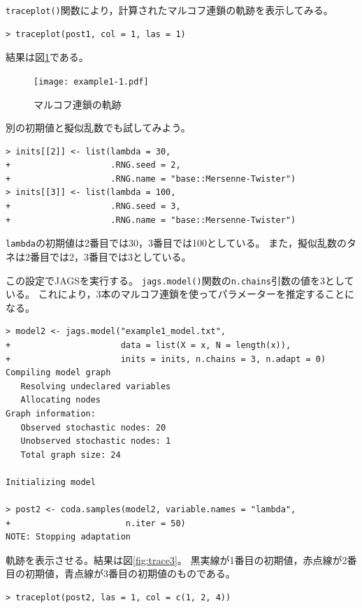 \documentclass[11pt,uplatex]{jsarticle}
\begin{document}
\texttt{traceplot()}関数により，計算されたマルコフ連鎖の軌跡を表示してみる。
\begin{lstlisting}
> traceplot(post1, col = 1, las = 1)
\end{lstlisting}
%
結果は図\ref{fig:trace1}である。

\begin{figure}[hbtp]
  \begin{center}
    \texttt{[image: example1-1.pdf]}
  \end{center}
  \caption{マルコフ連鎖の軌跡}
  \label{fig:trace1}
\end{figure}

別の初期値と擬似乱数でも試してみよう。
\begin{lstlisting}
> inits[[2]] <- list(lambda = 30,
+                    .RNG.seed = 2,
+                    .RNG.name = "base::Mersenne-Twister")
> inits[[3]] <- list(lambda = 100,
+                    .RNG.seed = 3,
+                    .RNG.name = "base::Mersenne-Twister")
\end{lstlisting}
\texttt{lambda}の初期値は2番目では30，3番目では100としている。
また，擬似乱数のタネは2番目では2，3番目では3としている。

この設定で\textsf{JAGS}を実行する。
\texttt{jags.model()}関数の\texttt{n.chains}引数の値を3としている。
これにより，3本のマルコフ連鎖を使ってパラメーターを推定することになる。
\begin{lstlisting}
> model2 <- jags.model("example1_model.txt",
+                      data = list(X = x, N = length(x)),
+                      inits = inits, n.chains = 3, n.adapt = 0)
Compiling model graph
   Resolving undeclared variables
   Allocating nodes
Graph information:
   Observed stochastic nodes: 20
   Unobserved stochastic nodes: 1
   Total graph size: 24

Initializing model

> post2 <- coda.samples(model2, variable.names = "lambda",
+                       n.iter = 50)
NOTE: Stopping adaptation

\end{lstlisting}

軌跡を表示させる。結果は図\ref{fig:trace3}。  黒実線が1番目の初期値，赤点線が2番目の初期値，青点線が3番目の初期値のものである。
\begin{lstlisting}
> traceplot(post2, las = 1, col = c(1, 2, 4))
\end{lstlisting}
\end{document}
